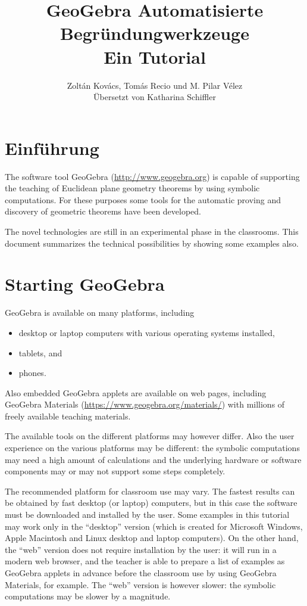 \documentclass{article}
\title{GeoGebra Automatisierte Begründungwerkzeuge\\ \large Ein Tutorial}
\author{Zolt\'an Kov\'acs, Tom\'as Recio und M. Pilar V\'elez\\
Übersetzt von Katharina Schiffler}
\begin{document}

\maketitle

\section{Einführung}

The software tool GeoGebra (\url{http://www.geogebra.org}) is capable of supporting the teaching of Euclidean plane geometry theorems by using symbolic computations. For these purposes some tools for the automatic proving and discovery of geometric theorems have been developed.

The novel technologies are still in an experimental phase in the classrooms. This document summarizes the technical possibilities by showing some examples also.

\section{Starting GeoGebra}

GeoGebra is available on many platforms, including
\begin{itemize}
    \item desktop or laptop computers with various operating systems installed,
    \item tablets, and
    \item phones.
\end{itemize}
Also embedded GeoGebra applets are available on web pages, including GeoGebra Materials (\url{https://www.geogebra.org/materials/}) with millions of freely available teaching materials.

The available tools on the different platforms may however differ. Also the user experience on the various platforms may be different: the symbolic computations may need a high amount of calculations and the underlying hardware or software components may or may not support some steps completely.

The recommended platform for classroom use may vary. The fastest results can be obtained by fast desktop (or laptop) computers, but in this case the software must be downloaded and installed by the user. Some examples in this tutorial may work only in the ``desktop'' version (which is created for Microsoft Windows, Apple Macintosh and Linux desktop and laptop computers). On the other hand, the ``web'' version does not require installation by the user: it will run in a modern web browser, and the teacher is able to prepare a list of examples as GeoGebra applets in advance before the classroom use by using GeoGebra Materials, for example. The ``web'' version is however slower: the symbolic computations may be slower by a magnitude.
\end{document}
